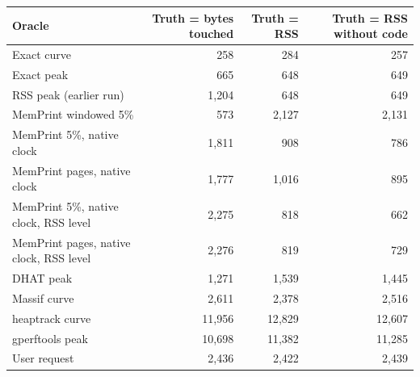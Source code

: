 \begin{tabular}{lrrr}
\toprule
Oracle & Truth = bytes touched & Truth = RSS & Truth = RSS without code \\
\midrule
Exact curve & 258 & 284 & 257 \\
Exact peak & 665 & 648 & 649 \\
RSS peak (earlier run) & 1{,}204 & 648 & 649 \\
MemPrint windowed 5\% & 573 & 2{,}127 & 2{,}131 \\
MemPrint 5\%, native clock & 1{,}811 & 908 & 786 \\
MemPrint pages, native clock & 1{,}777 & 1{,}016 & 895 \\
MemPrint 5\%, native clock, RSS level & 2{,}275 & 818 & 662 \\
MemPrint pages, native clock, RSS level & 2{,}276 & 819 & 729 \\
DHAT peak & 1{,}271 & 1{,}539 & 1{,}445 \\
Massif curve & 2{,}611 & 2{,}378 & 2{,}516 \\
heaptrack curve & 11{,}956 & 12{,}829 & 12{,}607 \\
gperftools peak & 10{,}698 & 11{,}382 & 11{,}285 \\
User request & 2{,}436 & 2{,}422 & 2{,}439 \\
\bottomrule
\end{tabular}
